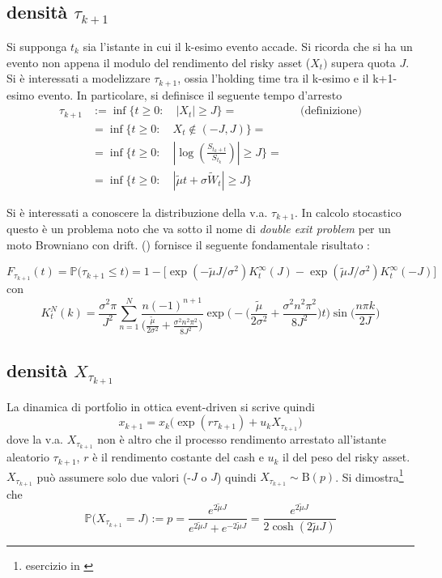 \documentclass[12pt]{article}
\theoremstyle{break}
\begin{document}
\subsection{densità $\tau_{k+1}$}
Si supponga $t_k$ sia l'istante in cui il k-esimo evento accade. Si ricorda che si ha un evento non appena il modulo del rendimento del risky asset ($X_t)$  supera quota $J$. Si è interessati a modelizzare  $\tau_{k+1}$, ossia l'holding time tra il k-esimo e il k+1-esimo evento. In particolare, si definisce il seguente tempo d'arresto
\begin{align*}
\tau_{k+1} & := \inf\{t\geq 0 : \quad |X_t| \geq J \} = && \text{(definizione)}\\
& = \inf\{t\geq 0 : \quad X_t \notin (-J,J) \} = \\
& = \inf\{t\geq 0 : \quad |\log(\frac{S_{t_k + t}}{S_{t_k}})| \geq J \} =\\
& = \inf\{t\geq 0 : \quad |\tilde{\mu} t + \sigma \widetilde{W}_t| \geq J \}
\end{align*}


Si è interessati a conoscere la distribuzione della v.a. $\tau_{k+1}$. In calcolo stocastico questo è un problema noto che va sotto il nome di  \textit{double exit problem} per un moto Browniano con drift. (\cite{PassTime}) fornisce il seguente fondamentale risultato :

\[
F_{\tau_{k+1}}(t) = \mathbb{P}\Big(\tau_{k+1}\leq t \Big) = 1 - \big[ \exp(-\tilde{\mu}J / \sigma^2) K_t^\infty(J) - \exp(\tilde{\mu}J / \sigma^2) K_t^\infty(-J)\big]
\]
con
\[
K_t^N(k) = \frac{\sigma^2\pi}{J^2}\sum_{n=1}^{N}\frac{n(-1)^{n+1}}{\big(\frac{\tilde{\mu}}{2\sigma^2} + \frac{\sigma^2n^2\pi^2}{8J^2}\big)}\exp\Big(-\big(\frac{\tilde{\mu}}{2\sigma^2} + \frac{\sigma^2n^2\pi^2}{8J^2}\big)t\Big) \sin\big(\frac{n\pi k}{2J}\big)
\]

\subsection{densità $X_{\tau_{k+1}}$}
La dinamica di portfolio in ottica event-driven si scrive quindi
\begin{equation}\label{ptfDyn}
\boxed{x_{k+1} = x_k \big(\exp(r \tau_{k+1}) + u_k X_{\tau_{k+1}}\big)}
\end{equation}
dove la v.a. $X_{\tau_{k+1}}$ non è altro che il processo rendimento arrestato all'istante aleatorio $\tau_{k+1}$, $r$ è il rendimento costante del cash e $u_k$ il del peso del risky asset.
$X_{\tau_{k+1}}$ può assumere solo due valori (-$J$ o $J$) quindi $X_{\tau_{k+1}} \sim \text{B}(p)$. Si dimostra\footnote{esercizio in \cite{Baldi}} che
\begin{equation}
\mathbb{P}\Big(X_{\tau_{k+1}} = J\Big) := p = \frac{e^{2\tilde{\mu}J}}{e^{2\tilde{\mu}J} + e^{-2\tilde{\mu}J}} = \frac{e^{2\tilde{\mu}J}}{2\cosh(2\tilde{\mu}J)}
\end{equation}
\end{document}
